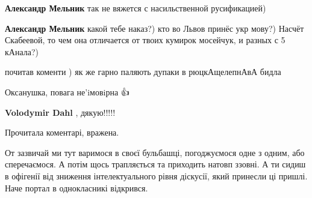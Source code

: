 \begin{itemize}
\begin{itemize}
\textbf{Александр Мельник} так не вяжется с насильственной русификацией)

 
\textbf{Александр Мельник} какой тебе наказ?) кто во Львов принёс укр мову?)
Насчёт Скабеевой, то чем она отличается от твоих кумирок мосейчук, и разных с 5 кАнала?)

\end{itemize}

 

почитав коменти ) як же гарно паляють дупаки в рюцкАщелепнАвА бидла 🤣

Оксанушка, повага не'iмовiрна 👍👏

\begin{itemize}
 
\textbf{Volodymir Dahl} , дякую!!!!!
\end{itemize}

 
Прочитала коментарі, вражена.

От зазвичай ми тут варимося в своєї бульбашці, погоджуємося одне з одним, або
сперечаємося. А потім щось трапляється та приходить натовп ззовні. А ти сидиш в
офігенії від зниження інтелектуального рівня діскусії, який принесли ці пришлі.
Наче портал в однокласникі відкрився.

\begin{itemize}
 

\end{itemize}
\end{itemize}
